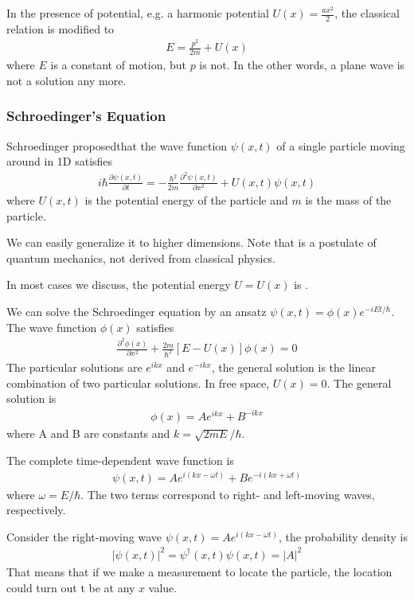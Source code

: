In the presence of potential, e.g. a harmonic potential $U(x)=\frac{ax^2}{2}$, the classical relation is modified to 
\begin{align*}
    E=\frac{p^2}{2m}+U(x)
\end{align*}
where $E$ is a constant of motion, but $p$ is not. In the other words, a plane wave is not a solution any more. 

\subsubsection{Schroedinger’s Equation}
Schroedinger proposedthat the wave function $\psi(x,t)$ of a single particle moving around in 1D satisfies
\begin{align*}
    i\hbar\frac{\partial \psi(x,t)}{\partial t}=-\frac{\hbar^2}{2m}\frac{\partial^2 \psi(x,t)}{\partial x^2}+U(x,t)\psi(x,t)
\end{align*}
where $U(x,t)$ is the potential energy of the particle and $m$ is the mass of the particle.  

We can easily generalize it to higher dimensions. Note that  is a postulate of quantum mechanics, not derived from classical physics.

In most cases we discuss, the potential energy $U=U(x)$ is . 

We can solve the Schroedinger equation by an ansatz $\psi(x,t)=\phi(x)e^{-iEt/\hbar}$. The wave function $\phi(x)$ satisfies
\begin{align*}
    \frac{\partial^2\phi(x)}{\partial x^2}+\frac{2m}{\hbar^2}[E-U(x)]\phi(x)=0
\end{align*}
The particular solutions are $e^{ikx}$ and $e^{-ikx}$, the general solution is the linear combination of two particular solutions. In free space, $U(x)=0$. The general solution is 
\begin{align*}
    \phi(x)=Ae^{ikx}+B^{-ikx}
\end{align*}
where A and B are constants and $k=\sqrt{2mE}/\hbar$. 

The complete time-dependent wave function is 
\begin{align*}
    \psi(x,t)=Ae^{i(kx-\omega t)}+Be^{-i(kx+\omega t)}
\end{align*}
where $\omega=E/\hbar$. The two terms correspond to right- and left-moving waves, respectively. 

Consider the right-moving wave $\psi(x,t)=Ae^{i(kx-\omega t)}$, the probability density is 
\begin{align*}
    |\psi(x,t)|^2=\psi^{\dagger}(x,t)\psi(x,t)=|A|^2
\end{align*}
That means that if we make a measurement to locate the particle, the location could turn out t be at any $x$ value. 

